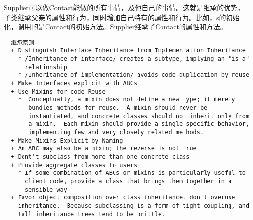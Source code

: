 Supplier可以做Contact能做的所有事情，及他自己的事情。这就是继承的优势，子类继承父亲的属性和行为，同时增加自己特有的属性和行为。比如，s的初始化，调用的是Contact的初始方法。Supplier继承了Contact的属性和方法。
\begin{framed}
  \begin{verbatim}
- 继承原则
  + Distinguish Interface Inheritance from Implementation Inheritance
    * /Inheritance of interface/ creates a subtype, implying an "is-a"
      relationship
    * /Inheritance of implementation/ avoids code duplication by reuse
  + Make Interfaces explicit with ABCs
  + Use Mixins for code Reuse
    *  Conceptually, a mixin does not define a new type; it merely
       bundles methods for reuse.  A mixin should never be
       instantiated, and concrete classes should not inherit only from
       a mixin.  Each mixin should provide a single specific behavior,
       implementing few and very closely related methods.
  + Make Mixins Explicit by Naming
  + An ABC may also be a mixin; the reverse is not true
  + Dont't subclass from more than one concrete class
  + Provide aggregate classes to users
    * If some combination of ABCs or mixins is particularly useful to
      client code, provide a class that brings them together in a
      sensible way
  + Favor object composition over class inheritance, don't overuse
    inheritance.  Because subclassing is a form of tight coupling, and
    tall inheritance trees tend to be brittle. 
\end{verbatim}
\end{framed}

    




